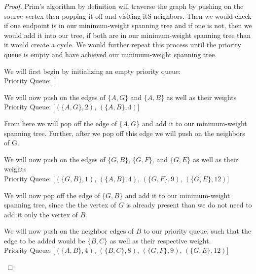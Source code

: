 \documentclass[11pt]{article}
\theoremstyle{definition}
\theoremstyle{definition}
\theoremstyle{definition}
\begin{document}
\begin{proof}
Prim's algorithm by definition will traverse the graph by pushing on the source vertex then popping it off and visiting itS neighbors. Then we would check if one endpoint is in our minimum-weight spanning tree and if one is not, then we would add it into our tree, if both are in our minimum-weight spanning tree than it would create a cycle. We would further repeat this process until the priority queue is empty and have achieved our minimum-weight spanning tree. \\

\begin{center}
We will first begin by initializing an empty priority queue: \\
Priority Queue: [] \\
\end{center}

\begin{center}
We will now push on the edges of $\{A, G\}$ and $\{A, B\}$ as well as their weights\\
Priority Queue: [$(\{A, G\},2)$, $(\{A, B\},4)$] \\
\end{center}

\begin{center}
From here we will pop off the edge of $\{A, G\}$ and add it to our minimum-weight spanning tree. Further, after we pop off this edge we will push on the neighbors of G.\\
\end{center}

\begin{center}
We will now push on the edges of $\{G, B\}$, $\{G, F\}$, and $\{G, E\}$ as well as their weights\\
Priority Queue: [$(\{G, B\},1)$, $(\{A, B\},4)$, $(\{G, F\},9)$, $(\{G, E\},12)$] \\
\end{center}

\begin{center}
We will now pop off the edge of $\{G, B\}$ and add it to our minimum-weight spanning tree, since the the vertex of $G$ is already present than we do not need to add it only the vertex of $B$.
\end{center}

\begin{center}
We will now push on the neighbor edges of $B$ to our priority queue, such that the edge to be added would be $\{B, C\}$ as well as their respective weight. \\
Priority Queue: [$(\{A, B\},4)$, $(\{B, C\},8)$, $(\{G, F\},9)$, $(\{G, E\},12)$] \\
\end{center}


\end{proof}
\end{document}

